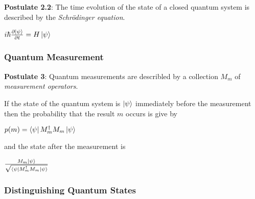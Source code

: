 \documentclass{article}
\begin{document}
\textbf{Postulate 2.2}: The time evolution of the state of a closed quantum
system is described by the \emph{Schrödinger equation}.

  \begin{center}
    $i\hbar\frac{\partial \ket{\psi}}{\partial t} = H\ket{\psi}$
  \end{center}

\subsubsection{Quantum Measurement}
\textbf{Postulate 3}: Quantum measurements are describled by a collection
${M_{m}}$ of \emph{measurement operators}.

If the state of the quantum system is $\ket{\psi}$ immediately before the
measurement then the probability that the result $m$ occurs is give by
  \begin{center}
    $p(m) = \bra{\psi}M_{m}^{\dagger}M_{m}\ket{\psi}$
  \end{center}
and the state after the measurement is
  \begin{center}
    $\frac{M_{m}\ket{\psi}}{\sqrt{\bra{\psi}M_{m}^{\dagger}M_{m}\ket{\psi}}}$
  \end{center}

\subsubsection{Distinguishing Quantum States}
\end{document}
